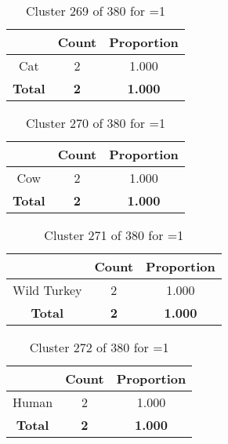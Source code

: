 \begin{table}[ht!]
\centering
\begin{tabular}{|c|c|c|}
\hline
\bf \Spec{} &\bf Count &\bf Proportion\\ \hline \hline
Cat & 2 & 1.000\\ \hline
\hline
\bf Total & \bf 2 & \bf 1.000\\ \hline
\end{tabular}
\label{tab:cluster:269:1}
\caption{Cluster 269 of 380 for \minneigh{}=1}
\end{table}

\clearpage
\begin{table}[ht!]
\centering
\begin{tabular}{|c|c|c|}
\hline
\bf \Spec{} &\bf Count &\bf Proportion\\ \hline \hline
Cow & 2 & 1.000\\ \hline
\hline
\bf Total & \bf 2 & \bf 1.000\\ \hline
\end{tabular}
\label{tab:cluster:270:1}
\caption{Cluster 270 of 380 for \minneigh{}=1}
\end{table}

\begin{table}[ht!]
\centering
\begin{tabular}{|c|c|c|}
\hline
\bf \Spec{} &\bf Count &\bf Proportion\\ \hline \hline
Wild Turkey & 2 & 1.000\\ \hline
\hline
\bf Total & \bf 2 & \bf 1.000\\ \hline
\end{tabular}
\label{tab:cluster:271:1}
\caption{Cluster 271 of 380 for \minneigh{}=1}
\end{table}

\begin{table}[ht!]
\centering
\begin{tabular}{|c|c|c|}
\hline
\bf \Spec{} &\bf Count &\bf Proportion\\ \hline \hline
Human & 2 & 1.000\\ \hline
\hline
\bf Total & \bf 2 & \bf 1.000\\ \hline
\end{tabular}
\label{tab:cluster:272:1}
\caption{Cluster 272 of 380 for \minneigh{}=1}
\end{table}

